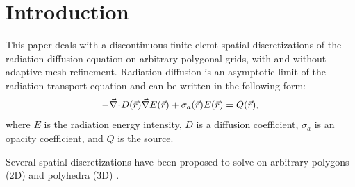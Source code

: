 \section{Introduction} \label{sec_intro}

This paper deals with a discontinuous finite elemt spatial discretizations of the radiation 
diffusion equation on arbitrary polygonal grids, with and without adaptive mesh refinement. 
Radiation diffusion is an asymptotic limit of the radiation transport equation and can be 
written in the following form:
\begin{equation} \label{eq:radiation_diffusion}
- \vec{\nabla}\! \cdot \!  D(\vec{r}) \vec{\nabla} E(\vec{r}) + \sigma_a(\vec{r}) E(\vec{r}) = Q(\vec{r}) ,
\end{equation}
where $E$ is the radiation energy intensity, $D$ is a diffusion coefficient, $\sigma_a$ is 
an opacity coefficient, and $Q$ is the source.

Several spatial discretizations have been proposed to solve  on
arbitrary polygons (2D) and polyhedra (3D) \cite{Wachspress,MorelDendyHallWhite1992,
PalmerLLNL,Palmer2005,MorelHallShashkov,BaileyAdams2008,KutnetsovMimetic}. 

